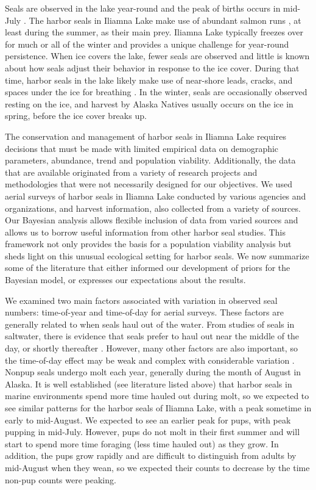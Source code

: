 \documentclass[12pt, titlepage]{article}\usepackage[]{graphicx}\usepackage[]{color}
\begin{document}
Seals are observed in the lake year-round and the peak of births occurs in mid-July \citep{Burn:Van:With:Hole:Asko:inte:2016}. The harbor seals in Iliamna Lake make use of abundant salmon runs \citep{Haus:Alle:Rich:Quin:resi:2008}, at least during the summer, as their main prey. Iliamna Lake typically freezes over for much or all of the winter and provides a unique challenge for year-round persistence. When ice covers the lake, fewer seals are observed and little is known about how seals adjust their behavior in response to the ice cover. During that time, harbor seals in the lake likely make use of near-shore leads, cracks, and spaces under the ice for breathing \citep{Burn:Van:With:Hole:Asko:inte:2016}. In the winter, seals are occasionally observed resting on the ice, and harvest by Alaska Natives usually occurs on the ice in spring, before the ice cover breaks up.   

The conservation and management of harbor seals in Iliamna Lake requires decisions that must be made with limited empirical data on demographic parameters, abundance, trend and population viability. Additionally, the data that are available originated from a variety of research projects and methodologies that were not necessarily designed for our objectives. We used aerial surveys of harbor seals in Iliamna Lake conducted by various agencies and organizations, and harvest information, also collected from a variety of sources. Our Bayesian analysis allows flexible inclusion of data from varied sources and allows us to borrow useful information from other harbor seal studies. This framework not only provides the basis for a population viability analysis but sheds light on this unusual ecological setting for harbor seals. We now summarize some of the literature that either informed our development of priors for the Bayesian model, or expresses our expectations about the results.

We examined two main factors associated with variation in observed seal numbers: time-of-year and time-of-day for aerial surveys.  These factors are generally related to when seals haul out of the water.  From studies of seals in saltwater, there is evidence that seals prefer to haul out near the middle of the day, or shortly thereafter \citep{Bove:Beng:With:Cesa:Simp:Fros:Burn:abun:2003,Simp:With:Cesa:Bove:stab:2003,Math:Pend:decl:2006,Ver:Lond:Bove:fast:2010}. However, many other factors are also important, so the time-of-day effect may be weak and complex with considerable variation \citep{Ver:Fros:baye:2003, Lond:VerH:Jeff:Lanc:Bove:haul:2012}.  Nonpup seals undergo molt each year, generally during the month of August in Alaska. It is well established (see literature listed above) that harbor seals in marine environments spend more time hauled out during molt, so we expected to see similar patterns for the harbor seals of Iliamna Lake, with a peak sometime in early to mid-August. We expected to see an earlier peak for pups, with peak pupping in mid-July. However, pups do not molt in their first summer and will start to spend more time foraging (less time hauled out) as they grow.  In addition, the pups grow rapidly and are difficult to distinguish from adults by mid-August when they wean, so we expected their counts to decrease by the time non-pup counts were peaking.
\end{document}
